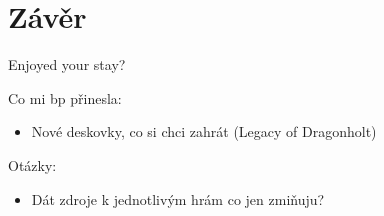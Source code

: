 \chapter{Závěr}

Enjoyed your stay?

Co mi bp přinesla:
\begin{itemize}
    \item Nové deskovky, co si chci zahrát (Legacy of Dragonholt)
\end{itemize}

Otázky:
\begin{itemize}
    \item Dát zdroje k jednotlivým hrám co jen zmiňuju?
\end{itemize}